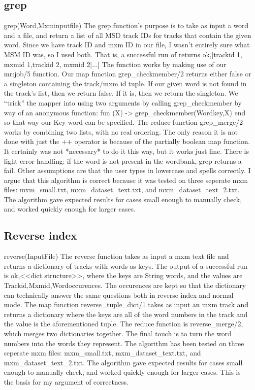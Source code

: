\documentclass{article}
\begin{document}
\subsection{grep}
grep(Word,Mxminputfile)
The grep function's purpose is to take as input a word and a file, and return a list of all MSD track IDs for tracks that contain the given word. Since we have track ID and mxm ID in our file, I wasn't entirely sure what MSM ID was, so I used both. That is, a successful run of returns
{ok,[{trackid 1, mxmid 1},{trackid 2, mxmid 2}|...]}
The function works by making use of our mr:job/5 function. Our map function grep\_checkmember/2 returns either false or a singleton containing the track/mxm id tuple. If our given word is not found in the track's list, then we return false. If it is, then we return the singleton. We ``trick'' the mapper into using two arguments by calling grep\_checkmember by way of an anonymous function:
fun (X) -> grep\_checkmember(Wordkey,X) end
so that way our Key word can be specified.
The reduce function grep\_merge/2 works by combining two lists, with no real ordering. The only reason it is not done with just the ++ operator is because of the partially boolean map function. It certainly was not *necessary* to do it this way, but it works just fine.
There is light error-handling: if the word is not present in the wordbank, grep returns a fail. Other assumptions are that the user types in lowercase and spells correctly.
I argue that this algorithm is correct because it was tested on three seperate mxm files: mxm\_small.txt, mxm\_dataset\_text.txt, and mxm\_dataset\_text\_2.txt. The algorithm gave expected results for cases small enough to manually check, and worked quickly enough for larger cases.

\subsection{Reverse index}
reverse(InputFile)
The reverse function takes as input a mxm text file and returns a dictionary of tracks with words as keys. The output of a successful run is
{ok,<<dict structure>>}, where the keys are String words, and the values are {{Trackid,Mxmid},Wordoccurences}. The occurences are kept so that the dictionary can technically answer the same questions both in reverse index and normal mode.
The map function reverse\_tuple\_dict/1 takes as input an mxm track and returns a dictionary where the keys are all of the word numbers in the track and the value is the aforementioned tuple.
The reduce function is reverse\_merge/2, which merges two dictionaries together. The final touch is to turn the word numbers into the words they represent.
The algorithm has been tested on three seperate mxm files: mxm\_small.txt, mxm\_dataset\_text.txt, and mxm\_dataset\_text\_2.txt. The algorithm gave expected results for cases small enough to manually check, and worked quickly enough for larger cases. This is the basis for my argument of correctness.
\end{document}
